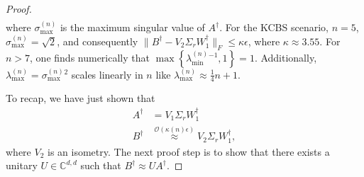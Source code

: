 \begin{proof}
\begin{align*}
\end{align*}
where $\sigma_{\text{max}}^{(n)}$ is the maximum singular value of $A^{\dag}$. For the KCBS scenario, $n=5$, $\sigma_{\text{max}}^{(n)}=\sqrt{2}$, and consequently $\|B^{\dag}-V_2\Sigma_r W_1^{\dag}\|_F\leq \kappa\epsilon$, where $\kappa \approx 3.55$. 
For $n>7$, one finds numerically that $\operatorname{max}\left\{\lambda_{\text{min}}^{(n)}{}^{-1},1\right\}=1$. Additionally, $\lambda_{\text{max}}^{(n)}=\sigma_{\text{max}}^{(n)}{}^2$ scales linearly in $n$ like $\lambda_{\text{max}}^{(n)}\approx \frac{1}{4}n+1$.

To recap, we have just shown that
\begin{align*}
A^{\dag} & =V_1\Sigma_r W_1^{\dag} \\[0.3em]
B^{\dag} & \stackrel{\mathcal{O}(\kappa(n)\epsilon)}{\approx} V_2\Sigma_r W_1^{\dag},
\end{align*}
where $V_2$ is an isometry. The next proof step is to show that there exists a unitary $U\in\mathbb{C}^{d,d}$ such that $B^{\dag}\approx U A^{\dag}$.


\end{proof}
